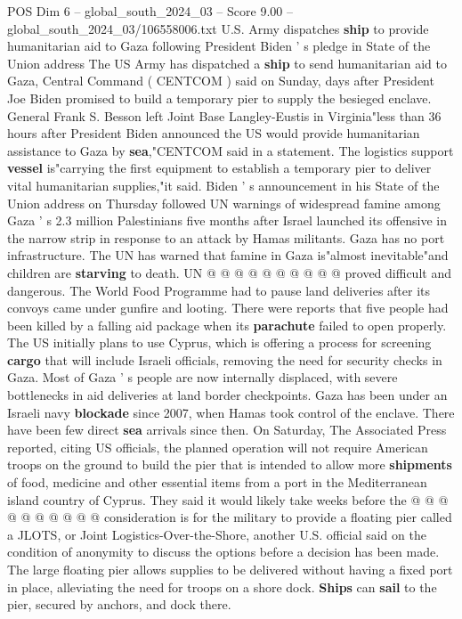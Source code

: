 \begin{textsample}{POS Dim 6 – global\_south\_2024\_03 – Score 9.00 – global\_south\_2024\_03/106558006.txt}  \label{ex:f6_pos_065}
U.S.
Army dispatches \textbf{ship} to provide humanitarian aid to Gaza following President Biden ' s pledge in State of the Union address The US Army has dispatched a \textbf{ship} to send humanitarian aid to Gaza, Central Command ( CENTCOM ) said on Sunday, days after President Joe Biden promised to build a temporary pier to supply the besieged enclave.
General Frank S.
Besson left Joint Base Langley-Eustis in Virginia"less than 36 hours after President Biden announced the US would provide humanitarian assistance to Gaza by \textbf{sea},"CENTCOM said in a statement.
The logistics support \textbf{vessel} is"carrying the first equipment to establish a temporary pier to deliver vital humanitarian supplies,"it said.
Biden ' s announcement in his State of the Union address on Thursday followed UN warnings of widespread famine among Gaza ' s 2.3 million Palestinians five months after Israel launched its offensive in the narrow strip in response to an attack by Hamas militants.
Gaza has no port infrastructure.
The UN has warned that famine in Gaza is"almost inevitable"and children are \textbf{starving} to death.
UN @ @ @ @ @ @ @ @ @ @ proved difficult and dangerous.
The World Food Programme had to pause land deliveries after its convoys came under gunfire and looting.
There were reports that five people had been killed by a falling aid package when its \textbf{parachute} failed to open properly.
The US initially plans to use Cyprus, which is offering a process for screening \textbf{cargo} that will include Israeli officials, removing the need for security checks in Gaza.
Most of Gaza ' s people are now internally displaced, with severe bottlenecks in aid deliveries at land border checkpoints.
Gaza has been under an Israeli navy \textbf{blockade} since 2007, when Hamas took control of the enclave.
There have been few direct \textbf{sea} arrivals since then.
On Saturday, The Associated Press reported, citing US officials, the planned operation will not require American troops on the ground to build the pier that is intended to allow more \textbf{shipments} of food, medicine and other essential items from a port in the Mediterranean island country of Cyprus.
They said it would likely take weeks before the @ @ @ @ @ @ @ @ @ @ consideration is for the military to provide a floating pier called a JLOTS, or Joint Logistics-Over-the-Shore, another U.S. official said on the condition of anonymity to discuss the options before a decision has been made.
The large floating pier allows supplies to be delivered without having a fixed port in place, alleviating the need for troops on a shore dock. \textbf{Ships} can \textbf{sail} to the pier, secured by anchors, and dock there.

\end{textsample}
